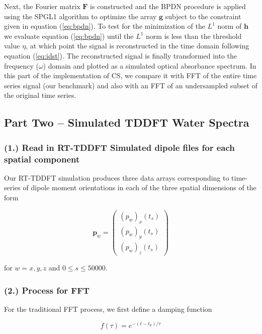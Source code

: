 \documentclass[11pt]{article}
\begin{document}
\par Next, the Fourier matrix $\mathbf{F}$ is constructed and the BPDN procedure is applied using the SPGL1 algorithm to optimize the array $\mathbf{g}$ subject to the constraint given in equation (\ref{eq:bpdn}). To test for the minimization of the $L^{1}$ norm of $\mathbf{h}$ we evaluate equation (\ref{eq:bpdn}) until the $L^{1}$ norm is less than the threshold value $\eta$, at which point the signal is reconstructed in the time domain following equation (\ref{eq:idst}).  The reconstructed signal is finally transformed into the frequency ($\omega$) domain and plotted as a simulated optical absorbance spectrum. In this part of the implementation of CS, we compare it with FFT of the entire time series signal (our benchmark) and also with an FFT of an undersampled subset of the original time series.  

\subsection*{Part Two -- Simulated TDDFT Water Spectra}

\subsubsection*{(1.)	Read in RT-TDDFT Simulated dipole files for each spatial component}
Our RT-TDDFT simulation produces three data arrays corresponding to time-series of dipole moment orientations in each of the three spatial dimensions of the form

\begin{equation}\label{eq:dipoles}
	\mathbf{p}_{w}= \begin{pmatrix} (p_{w})_{x}(t_{s})\\  (p_{w})_{y}(t_{s}) \\  (p_{w})_{z}(t_{s})\end{pmatrix}
\end{equation}

for $w = x, y, z$ and $0 \leq s \leq 50000$.

\subsubsection*{(2.)	Process for FFT}

For the traditional FFT process, we first define a damping function 

\begin{equation}\label{eq:damp}
	f(\tau) = e^{-(t - t_{0}) / \tau}
\end{equation}
\end{document}
